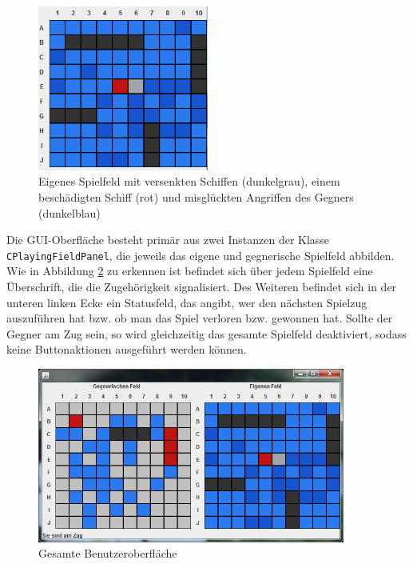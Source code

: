 \begin{figure}[H]
  \centering
  \includegraphics[width=0.5\textwidth]{images/JavaOwnPlayingFieldPanel.png}
  \caption{Eigenes Spielfeld mit versenkten Schiffen (dunkelgrau), einem beschädigten Schiff (rot) und misglückten Angriffen des Gegners (dunkelblau)}
  \label{fig:EigenesSpielfeldpanel}
\end{figure}

Die GUI-Oberfläche besteht primär aus zwei Instanzen der Klasse \texttt{CPlayingFieldPanel}, die jeweils das eigene und gegnerische Spielfeld abbilden.
Wie in Abbildung \ref{fig:GUI} zu erkennen ist befindet sich über jedem Spielfeld eine Überschrift, die die Zugehörigkeit signalisiert.
Des Weiteren befindet sich in der unteren linken Ecke ein Statusfeld, das angibt, wer den nächsten Spielzug auszuführen hat bzw. ob man das Spiel verloren bzw. gewonnen hat.
Sollte der Gegner am Zug sein, so wird gleichzeitig das gesamte Spielfeld deaktiviert, sodass keine Buttonaktionen ausgeführt werden können.

\begin{figure}[H]
  \centering
  \includegraphics[width=0.9\textwidth]{images/JavaClientGUI.png}
  \caption{Gesamte Benutzeroberfläche}
  \label{fig:GUI}
\end{figure}


